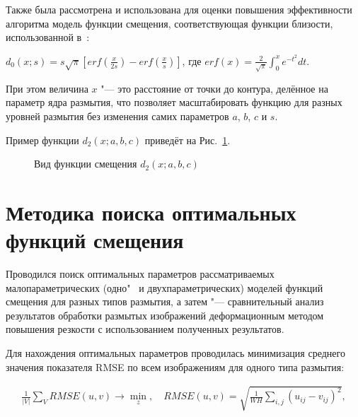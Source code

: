 Также была рассмотрена и использована для оценки повышения эффективности алгоритма модель функции смещения, соответствующая функции близости, использованной в~\cite{nasonova2014deblurred, gusev2016parallel}:

$d_0\left(x; s\right)=s\sqrt\pi\left[erf\left(\frac{x}{2s}\right)-erf\left(\frac{x}{s}\right)\right]$, где $erf{\left(x\right)}=\frac{2}{\sqrt\pi}\int_{0}^{x}{e^{-t^2}dt}$.

При этом величина $x$ "--- это расстояние от точки до контура, делённое на параметр ядра размытия, что позволяет масштабировать функцию для разных уровней размытия без изменения самих параметров $a$, $b$, $c$ и $s$.

Пример функции $d_2(x; a, b, c)$ приведёт на Рис.~\ref{fig:warping-d2-example}.

\begin{figure}[ht]
	\caption{Вид функции смещения $d_2(x;a,b,c)$}
	\label{fig:warping-d2-example}
\end{figure}

\section{Методика поиска оптимальных функций смещения}

Проводился поиск оптимальных параметров рассматриваемых малопараметрических (одно"~ и двухпараметрических) моделей функций смещения для разных типов размытия, а затем "--- сравнительный анализ результатов обработки размытых изображений деформационным методом повышения резкости с использованием полученных результатов.

Для нахождения оптимальных параметров проводилась минимизация среднего значения показателя RMSE по всем изображениям для одного типа размытия:

\begin{align*}
	\frac{1}{\left|V\right|}\sum_{V}{RMSE\left(u,v\right) \rightarrow \min_{z}}, \quad
	RMSE\left(u,v\right)=\sqrt{\frac{1}{WH}\sum_{i,j}{(u_{ij}-v_{ij})}^2},
\end{align*}

%

